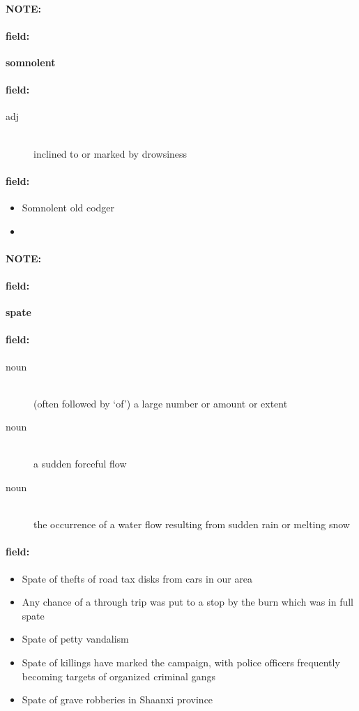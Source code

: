 \documentclass[12pt]{article}
\newenvironment{note}{\paragraph{NOTE:}}{}
\newenvironment{field}{\paragraph{field:}}{}
\begin{document}
\begin{note}
\begin{field}
\textbf{\large somnolent}
\end{field}


\begin{field}
\begin{description}
\item[adj] \hfill \\ 
inclined to or marked by drowsiness

\end{description}
\end{field}

\begin{field}
\begin{itemize}
\item Somnolent old codger
\item 
\end{itemize}
\end{field}
\end{note}
\begin{note}
\begin{field}
\textbf{\large spate}
\end{field}


\begin{field}
\begin{description}
\item[noun] \hfill \\ 
(often followed by `of') a large number or amount or extent

\item[noun] \hfill \\ 
a sudden forceful flow

\item[noun] \hfill \\ 
the occurrence of a water flow resulting from sudden rain or melting snow

\end{description}
\end{field}

\begin{field}
\begin{itemize}
\item Spate of thefts of road tax disks from cars in our area
\item Any chance of a through trip was put to a stop by the burn which was in full spate
\item Spate of petty vandalism
\item Spate of killings have marked the campaign, with police officers frequently becoming targets of organized criminal gangs
\item Spate of grave robberies in Shaanxi province
\end{itemize}
\end{field}
\end{note}
\end{document}
